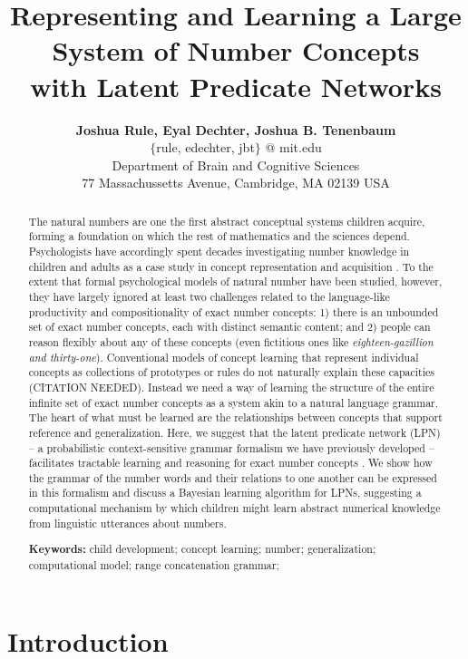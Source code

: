 \documentclass[10pt,letterpaper]{article}
\title{Representing and Learning a Large System of Number Concepts \\ with Latent Predicate Networks}
\author{{\large \bf Joshua Rule, Eyal Dechter, Joshua B. Tenenbaum} \\
  $\{$rule, edechter, jbt$\}$ @ mit.edu \\
  Department of Brain and Cognitive Sciences\\
  77 Massachussetts Avenue, Cambridge, MA 02139 USA}
\begin{document}
\maketitle

\begin{abstract}
  The natural numbers are one the first abstract conceptual systems
  children acquire, forming a foundation on which the rest of
  mathematics and the sciences depend. Psychologists have accordingly
  spent decades investigating number knowledge in children and adults
  as a case study in concept representation and acquisition
  \citep[{\it e.g.}][]{Car2009}. To the extent that formal
  psychological models of natural number have been studied, however,
  they have largely ignored at least two challenges related to the
  language-like productivity and compositionality of exact number
  concepts: 1) there is an unbounded set of exact number concepts,
  each with distinct semantic content; and 2) people can reason
  flexibly about any of these concepts (even fictitious ones like
  \emph{eighteen-gazillion and thirty-one}). Conventional models of
  concept learning that represent individual concepts as collections
  of prototypes or rules do not naturally explain these capacities
  (CITATION NEEDED). Instead we need a way of learning the structure
  of the entire infinite set of exact number concepts as a system akin
  to a natural language grammar. The heart of what must be learned are
  the relationships between concepts that support reference and
  generalization. Here, we suggest that the latent predicate network
  (LPN) -- a probabilistic context-sensitive grammar formalism we have
  previously developed -- facilitates tractable learning and reasoning
  for exact number concepts \citep{DecRulTenming}. We show how the
  grammar of the number words and their relations to one another can
  be expressed in this formalism and discuss a Bayesian learning
  algorithm for LPNs, suggesting a computational mechanism by which
  children might learn abstract numerical knowledge from linguistic
  utterances about numbers.

  \textbf{Keywords:}
  child development; concept learning; number; generalization;
  computational model; range concatenation grammar;
\end{abstract}

\section{Introduction}
\end{document}

